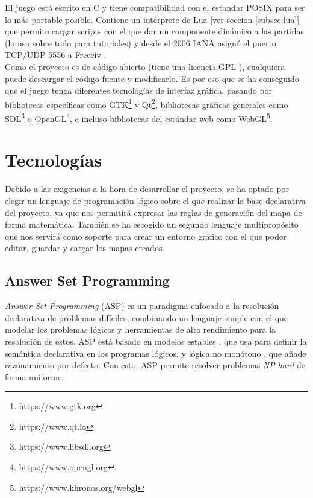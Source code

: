 El juego está escrito en C y tiene compatibilidad con el estandar POSIX para ser lo más portable posible. Contiene un intérprete de Lua [ver seccion \ref{subsec:lua}] que permite cargar scripts con el que dar un componente dinámico a las partidas (lo usa sobre todo para tutoriales) y desde el 2006 IANA asignó el puerto TCP/UDP 5556 a Freeciv \cite{iana_2006}. \\

Como el proyecto es de código abierto (tiene una licencia GPL \cite{gplv3}), cualquiera puede descargar el código fuente y modificarlo. Es por eso que se ha conseguido que el juego tenga diferentes tecnologías de interfaz gráfica, pasando por bibliotecas específicas como GTK\footnote{https://www.gtk.org} y Qt\footnote{https://www.qt.io}, bibliotecas gráficas generales como SDL\footnote{https://www.libsdl.org} o OpenGL\footnote{https://www.opengl.org}, e incluso bibliotecas del estándar web como WebGL\footnote{https://www.khronos.org/webgl}.

\section{Tecnologías}

Debido a las exigencias a la hora de desarrollar el proyecto, se ha optado por elegir un lenguaje de programación lógico sobre el que realizar la base declarativa del proyecto, ya que nos permitirá expresar las reglas de generación del mapa de forma matemática. También se ha escogido un segundo lenguaje multipropósito que nos servirá como soporte para crear un entorno gráfico con el que poder editar, guardar y cargar los mapas creados.

\subsection{Answer Set Programming}\label{asp}

\textit{Answer Set Programming} (ASP) es un paradigma enfocado a la resolución declarativa de problemas difíciles, combinando un lenguaje simple con el que modelar los problemas lógicos y herramientas de alto rendimiento para la resolución de estos. ASP está basado en modelos estables \cite{stablemodels}, que usa para definir la semántica declarativa en los programas lógicos, y lógica no monótono \cite{nonmonotonic}, que añade razonamiento por defecto. Con esto, ASP permite resolver problemas \textit{NP-hard} de forma uniforme. \\

